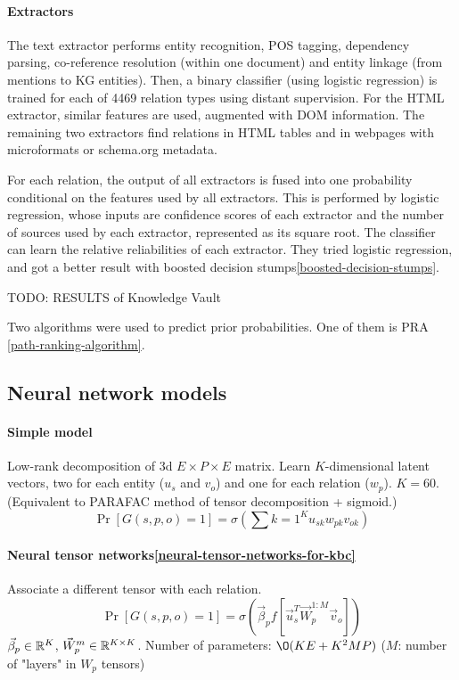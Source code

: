 \paragraph{Extractors}
The text extractor performs entity recognition, POS tagging, dependency parsing,
co-reference resolution (within one document) and entity linkage (from mentions
to KG entities).
Then, a binary classifier (using logistic regression) is trained for each of
4469 relation types using distant supervision.
For the HTML extractor, similar features are used, augmented with DOM
information.
The remaining two extractors find relations in HTML tables and in webpages
with microformats or schema.org metadata.

For each relation, the output of all extractors is fused into one probability
conditional on the features used by all extractors. This is performed by
logistic regression, whose inputs are confidence scores of each extractor and
the number of sources used by each extractor, represented as its square root.
The classifier can learn the relative reliabilities of each extractor.
They tried logistic regression, and got a better result with boosted decision
stumps\ref{boosted-decision-stumps}.

TODO: RESULTS of Knowledge Vault

Two algorithms were used to predict prior probabilities.
One of them is PRA \ref{path-ranking-algorithm}.

\subsection{Neural network models}

\paragraph{Simple model}
Low-rank decomposition of 3d $E\times P\times E$ matrix. Learn $K$-dimensional
latent vectors, two for each entity ($u_s$ and $v_o$) and one for each relation
($w_p$). $K=60$. (Equivalent to PARAFAC method of tensor decomposition +
sigmoid.)
$$\Pr[G(s,p,o)=1] = \sigma(\sum\limits{k=1}^K u_{sk} w_{pk} v_{ok})$$

\paragraph{Neural tensor networks\ref{neural-tensor-networks-for-kbc}}
Associate a different tensor with each relation.
$$\Pr[G(s,p,o)=1] = \sigma(\vec{\beta}_p f[\vec{u}_s^T \vec{W}_p^{1:M} \vec{v}_o])$$
$\vec{\beta}_p\in\mathbb{R}^K$, $\vec{W}_p^m\in\mathbb{R}^{K\times K}$.
Number of parameters: $\O(KE+K^2 MP)$ ($M$: number of "layers" in $W_p$ tensors)

